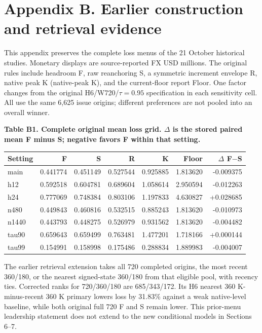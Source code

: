 \documentclass[10pt,a4paper]{article}
\begin{document}
\section*{Appendix B. Earlier construction and retrieval evidence}
This appendix preserves the complete loss menus of the 21 October historical studies. Monetary displays are source-reported FX USD millions. The original rules include headroom F, raw reanchoring S, a symmetric increment envelope R, native peak K (native-peak K), and the current-floor report Floor. One factor changes from the original H6/W720/\(\tau=0.95\) specification in each sensitivity cell. All use the same 6,625 issue origins; different preferences are not pooled into an overall winner.

\begin{center}
\begin{minipage}{\linewidth}
\small\textbf{Table B1. Complete original mean loss grid. \(\Delta\) is the stored paired mean F minus S; negative favors F within that setting.}\par\medskip
\centering\fontsize{8}{10}\selectfont
\begin{tabular}{lrrrrrr}
\toprule
Setting & F & S & R & K & Floor & \(\Delta\) F\(-\)S \\
\midrule
main & 0.441774 & 0.451149 & 0.527544 & 0.925885 & 1.813620 & -0.009375 \\
h12 & 0.592518 & 0.604781 & 0.689604 & 1.058614 & 2.950594 & -0.012263 \\
h24 & 0.777069 & 0.748384 & 0.803106 & 1.197833 & 4.630827 & +0.028685 \\
n480 & 0.449843 & 0.460816 & 0.532515 & 0.885243 & 1.813620 & -0.010973 \\
n1440 & 0.443793 & 0.448275 & 0.526979 & 0.931562 & 1.813620 & -0.004482 \\
tau90 & 0.659643 & 0.659499 & 0.763481 & 1.477201 & 1.718166 & +0.000144 \\
tau99 & 0.154991 & 0.158998 & 0.175486 & 0.288834 & 1.889983 & -0.004007 \\
\bottomrule
\end{tabular}
\end{minipage}
\end{center}
The earlier retrieval extension takes all 720 completed origins, the most recent 360/180, or the nearest signed-state 360/180 from that eligible pool, with recency ties. Corrected ranks for 720/360/180 are 685/343/172. Its H6 nearest 360 K-minus-recent 360 K primary lowers loss by 31.83\% against a weak native-level baseline, while both original full 720 F and S remain lower. This prior-menu leadership statement does not extend to the new conditional models in Sections 6--7.
\end{document}
